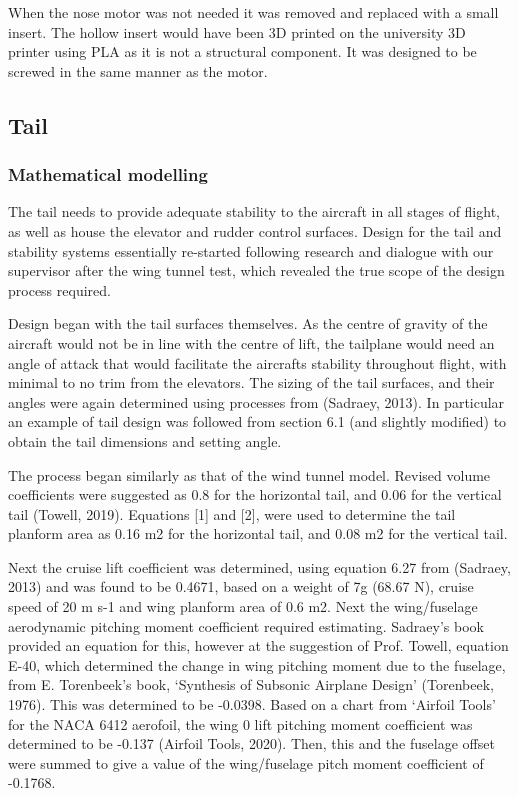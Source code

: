 \documentclass[../../main.tex]{subfiles}
\begin{document}
When the nose motor was not needed it was removed and replaced with a small insert.
The hollow insert would have been 3D printed on the university 3D printer using PLA as it is not a structural component.
It was designed to be screwed in the same manner as the motor. 


\subsection{Tail} \label{sec:design-process:final-design-proposal:tail}

\subsubsection{Mathematical modelling} \label{sec:design-process:final-design-proposal:tail:mathematical-modelling}

The tail needs to provide adequate stability to the aircraft in all stages of flight, as well as house the elevator and rudder control surfaces.
Design for the tail and stability systems essentially re-started following research and dialogue with our supervisor after the wing tunnel test, which revealed the true scope of the design process required. 

Design began with the tail surfaces themselves.
As the centre of gravity of the aircraft would not be in line with the centre of lift, the tailplane would need an angle of attack that would facilitate the aircrafts stability throughout flight, with minimal to no trim from the elevators.
The sizing of the tail surfaces, and their angles were again determined using processes from (Sadraey, 2013).
In particular an example of tail design was followed from section 6.1 (and slightly modified) to obtain the tail dimensions and setting angle. 

The process began similarly as that of the wind tunnel model.
Revised volume coefficients were suggested as 0.8 for the horizontal tail, and 0.06 for the vertical tail (Towell, 2019).
Equations [1] and [2], were used to determine the tail planform area as 0.16 m2 for the horizontal tail, and 0.08 m2 for the vertical tail.  

Next the cruise lift coefficient was determined, using equation 6.27 from (Sadraey, 2013) and was found to be 0.4671, based on a weight of 7g (68.67 N), cruise speed of 20 m s-1 and wing planform area of 0.6 m2.
Next the wing/fuselage aerodynamic pitching moment coefficient required estimating.
Sadraey’s book provided an equation for this, however at the suggestion of Prof. Towell, equation E-40, which determined the change in wing pitching moment due to the fuselage, from E. Torenbeek’s book, ‘Synthesis of Subsonic Airplane Design’ (Torenbeek, 1976).
This was determined to be -0.0398.
Based on a chart from ‘Airfoil Tools’ for the NACA 6412 aerofoil, the wing 0 lift pitching moment coefficient was determined to be -0.137 (Airfoil Tools, 2020).
Then, this and the fuselage offset were summed to give a value of the wing/fuselage pitch moment coefficient of -0.1768. 
\end{document}
